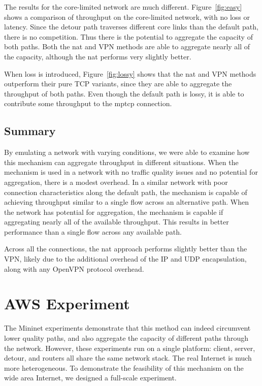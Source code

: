 \documentclass{cwru}
\begin{document}
The results for the core-limited network are much different.
Figure~\ref{fig:easy} shows a comparison of throughput on the core-limited
network, with no loss or latency. Since the detour path traverses different core
links than the default path, there is no competition. Thus there is the
potential to aggregate the capacity of both paths. Both the \ac{nat} and VPN
methods are able to aggregate nearly all of the capacity, although the \ac{nat}
performs very slightly better.

When loss is introduced, Figure~\ref{fig:lossy} shows that the \ac{nat} and VPN
methods outperform their pure TCP variants, since they are able to aggregate the
throughput of both paths. Even though the default path is lossy, it is able to
contribute some throughput to the \ac{mptcp} connection.

\subsection{Summary}

By emulating a network with varying conditions, we were able to examine how this
mechanism can aggregate throughput in different situations. When the mechanism
is used in a network with no traffic quality issues and no potential for
aggregation, there is a modest overhead. In a similar network with poor
connection characteristics along the default path, the mechanism is capable of
achieving throughput similar to a single flow across an alternative path.
When the network has potential for aggregation, the mechanism is capable if
aggregating nearly all of the available throughput. This results in better
performance than a single flow across any available path.

Across all the connections, the \ac{nat} approach performs slightly better than
the VPN, likely due to the additional overhead of the IP and UDP encapsulation,
along with any OpenVPN protocol overhead.

\section{AWS Experiment}

The Mininet experiments demonstrate that this method can indeed circumvent lower
quality paths, and also aggregate the capacity of different paths through the
network. However, these experiments run on a single platform: client, server,
detour, and routers all share the same network stack. The real Internet is much
more heterogeneous. To demonstrate the feasibility of this mechanism on the wide
area Internet, we designed a full-scale experiment.
\end{document}
